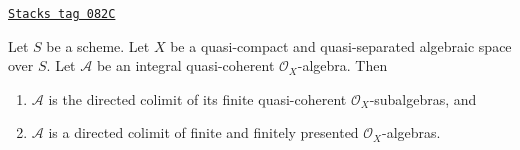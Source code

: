 \begin{lemma}
\label{spaces-limits-lemma-integral-algebra-directed-colimit-finite}
\href{https://stacks.math.columbia.edu/tag/082C}{\texttt{Stacks tag 082C}}

Let $S$ be a scheme. Let $X$ be a quasi-compact and quasi-separated
algebraic space over $S$. Let $\mathcal{A}$ be an integral quasi-coherent
$\mathcal{O}_X$-algebra. Then
\begin{enumerate}
\item $\mathcal{A}$ is the directed colimit of its finite
quasi-coherent $\mathcal{O}_X$-subalgebras, and
\item $\mathcal{A}$ is a directed colimit of finite and finitely presented
$\mathcal{O}_X$-algebras.
\end{enumerate}
\end{lemma}

